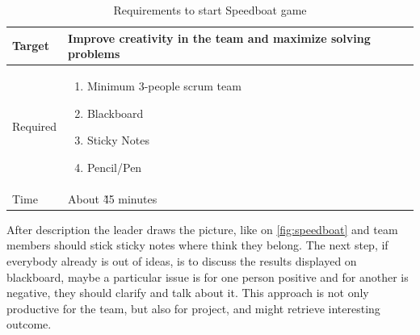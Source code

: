 \begin{table}[h]
	\caption{Requirements to start Speedboat game}
	\label{tab:speedboat-req}
	\begin{tabularx}{\textwidth}{|X|X|}
	\hline
		Target & Improve creativity in the team and maximize solving problems  \\ \hline
		Required			& \begin{enumerate}
		    \item Minimum 3-people scrum team
		    \item Blackboard
		    \item Sticky Notes
		    \item Pencil/Pen
		\end{enumerate}	 \\ \hline
		Time			& About \~45 minutes	 \\ \hline

	\end{tabularx}
\end{table}

After description the leader draws the picture, like on  \autoref{fig:speedboat} and team members should stick sticky notes where think they belong. The next step, if everybody already is out of ideas, is to discuss the results displayed on blackboard, maybe a particular issue is for one person positive and for another is negative, they should clarify and talk about it. This approach is not only productive for the team, but also for project, and might retrieve interesting outcome.

